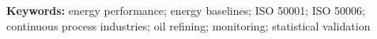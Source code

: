 

\bigskip
\noindent\textbf{Keywords:} energy performance; energy baselines; ISO 50001; ISO 50006; continuous process industries; oil refining; monitoring; statistical validation
